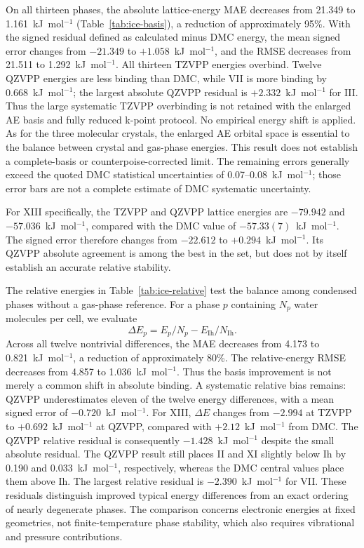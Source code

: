 

On all thirteen phases, the absolute lattice-energy MAE decreases from 21.349 to 1.161~kJ~mol$^{-1}$ (Table~\ref{tab:ice-basis}), a reduction of approximately 95\%. With the signed residual defined as calculated minus DMC energy, the mean signed error changes from $-21.349$ to $+1.058$~kJ~mol$^{-1}$, and the RMSE decreases from 21.511 to 1.292~kJ~mol$^{-1}$. All thirteen TZVPP energies overbind. Twelve QZVPP energies are less binding than DMC, while VII is more binding by 0.668~kJ~mol$^{-1}$; the largest absolute QZVPP residual is $+2.332$~kJ~mol$^{-1}$ for III. Thus the large systematic TZVPP overbinding is not retained with the enlarged AE basis and fully reduced k-point protocol. No empirical energy shift is applied. As for the three molecular crystals, the enlarged AE orbital space is essential to the balance between crystal and gas-phase energies. This result does not establish a complete-basis or counterpoise-corrected limit. The remaining errors generally exceed the quoted DMC statistical uncertainties of 0.07--0.08~kJ~mol$^{-1}$; those error bars are not a complete estimate of DMC systematic uncertainty.

For XIII specifically, the TZVPP and QZVPP lattice energies are $-79.942$ and $-57.036$~kJ~mol$^{-1}$, compared with the DMC value of $-57.33(7)$~kJ~mol$^{-1}$. The signed error therefore changes from $-22.612$ to $+0.294$~kJ~mol$^{-1}$. Its QZVPP absolute agreement is among the best in the set, but does not by itself establish an accurate relative stability.



The relative energies in Table~\ref{tab:ice-relative} test the balance among condensed phases without a gas-phase reference. For a phase $p$ containing $N_p$ water molecules per cell, we evaluate
\begin{equation}
 \Delta E_p = E_p/N_p-E_{\mathrm{Ih}}/N_{\mathrm{Ih}}.
\end{equation}
Across all twelve nontrivial differences, the MAE decreases from 4.173 to 0.821~kJ~mol$^{-1}$, a reduction of approximately 80\%. The relative-energy RMSE decreases from 4.857 to 1.036~kJ~mol$^{-1}$. Thus the basis improvement is not merely a common shift in absolute binding. A systematic relative bias remains: QZVPP underestimates eleven of the twelve energy differences, with a mean signed error of $-0.720$~kJ~mol$^{-1}$. For XIII, $\Delta E$ changes from $-2.994$ at TZVPP to $+0.692$~kJ~mol$^{-1}$ at QZVPP, compared with $+2.12$~kJ~mol$^{-1}$ from DMC. The QZVPP relative residual is consequently $-1.428$~kJ~mol$^{-1}$ despite the small absolute residual. The QZVPP result still places II and XI slightly below Ih by 0.190 and 0.033~kJ~mol$^{-1}$, respectively, whereas the DMC central values place them above Ih. The largest relative residual is $-2.390$~kJ~mol$^{-1}$ for VII. These residuals distinguish improved typical energy differences from an exact ordering of nearly degenerate phases. The comparison concerns electronic energies at fixed geometries, not finite-temperature phase stability, which also requires vibrational and pressure contributions.
